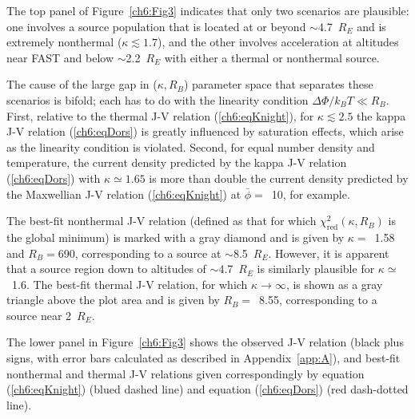   The top panel of Figure~\ref{ch6:Fig3} indicates that only two scenarios are
  plausible: one involves a source population that is located at or beyond
  $\sim$4.7~$R_E$ and is extremely nonthermal ($\kappa \lesssim 1.7$), and the
  other involves acceleration at altitudes near FAST and below $\sim$2.2~$R_E$
  with either a thermal or nonthermal source. 

  The cause of the large gap in ($\kappa, R_B$) parameter space that separates
  these scenarios is bifold; each has to do with the linearity condition
  $\Delta \Phi / k_B T \ll R_B $. First, relative to the thermal J-V relation
  (\ref{ch6:eqKnight}), for $\kappa \lesssim 2.5$ the kappa J-V relation
  (\ref{ch6:eqDors}) is greatly influenced by saturation effects, which arise as
  the linearity condition is violated. Second, for equal number density and
  temperature, the current density predicted by the kappa J-V relation
  (\ref{ch6:eqDors}) with $\kappa \simeq 1.65$ is more than double the current
  density predicted by the Maxwellian J-V relation (\ref{ch6:eqKnight}) at
  $\bar{\phi} =$~10, for example.

  The best-fit nonthermal J-V relation (defined as that for which
  $\chi^2_{\textrm{red}} ( \kappa, R_B )$ is the global minimum) is marked with
  a gray diamond and is given by $\kappa =$~1.58 and $R_B =$690, corresponding
  to a source at $\sim$8.5~$R_E$. However, it is apparent that a source region
  down to altitudes of $\sim$4.7~$R_E$ is similarly plausible for
  $\kappa \simeq$~1.6. The best-fit thermal J-V relation, for which
  $\kappa \rightarrow \infty$, is shown as a gray triangle above the plot area
  and is given by $R_B =$~8.55, corresponding to a source near 2~$R_E$.

  The lower panel in Figure~\ref{ch6:Fig3} shows the observed J-V relation
  (black plus signs, with error bars calculated as described in
  Appendix~\ref{app:A}), and best-fit nonthermal and thermal J-V relations given
  correspondingly by equation (\ref{ch6:eqKnight}) (blued dashed line) and
  equation (\ref{ch6:eqDors}) (red dash-dotted line).

